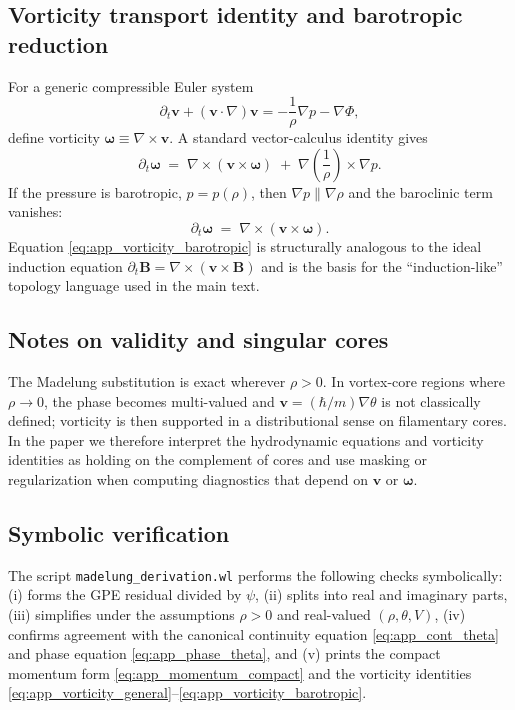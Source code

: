 \documentclass[11pt]{article}
\theoremstyle{plain}
\theoremstyle{definition}
\theoremstyle{remark}
\newcommand{\B}{\mathbf{B}}
\newcommand{\vfield}{\mathbf{v}}
\newcommand{\omegaV}{\boldsymbol{\omega}}
\begin{document}
\subsection{Vorticity transport identity and barotropic reduction}
For a generic compressible Euler system
\begin{equation}\label{eq:app_generic_euler}
  \partial_t\vfield + (\vfield\cdot\nabla)\vfield
  = -\frac{1}{\rho}\nabla p - \nabla\Phi,
\end{equation}
define vorticity $\omegaV \equiv \nabla\times\vfield$. A standard vector-calculus identity gives
\begin{equation}\label{eq:app_vorticity_general}
  \partial_t\omegaV
  \;=\;
  \nabla\times(\vfield\times\omegaV)
  \;+\;
  \nabla\!\left(\frac{1}{\rho}\right)\times\nabla p.
\end{equation}
If the pressure is barotropic, $p=p(\rho)$, then $\nabla p \parallel \nabla\rho$ and the baroclinic term
vanishes:
\begin{equation}\label{eq:app_vorticity_barotropic}
  \partial_t\omegaV \;=\; \nabla\times(\vfield\times\omegaV).
\end{equation}
Equation \eqref{eq:app_vorticity_barotropic} is structurally analogous to the ideal induction equation
$\partial_t\B=\nabla\times(\vfield\times\B)$ and is the basis for the ``induction-like'' topology
language used in the main text.

\subsection{Notes on validity and singular cores}
The Madelung substitution is exact wherever $\rho>0$. In vortex-core regions where $\rho\to 0$, the
phase becomes multi-valued and $\vfield=(\hbar/m)\nabla\theta$ is not classically defined; vorticity is
then supported in a distributional sense on filamentary cores. In the paper we therefore interpret the
hydrodynamic equations and vorticity identities as holding on the complement of cores and use masking or
regularization when computing diagnostics that depend on $\vfield$ or $\omegaV$.

\subsection{Symbolic verification}
The script \texttt{madelung\_derivation.wl} performs the following checks symbolically:
(i) forms the GPE residual divided by $\psi$,
(ii) splits into real and imaginary parts,
(iii) simplifies under the assumptions $\rho>0$ and real-valued $(\rho,\theta,V)$,
(iv) confirms agreement with the canonical continuity equation \eqref{eq:app_cont_theta} and phase
equation \eqref{eq:app_phase_theta}, and
(v) prints the compact momentum form \eqref{eq:app_momentum_compact} and the vorticity identities
\eqref{eq:app_vorticity_general}--\eqref{eq:app_vorticity_barotropic}.
\end{document}
